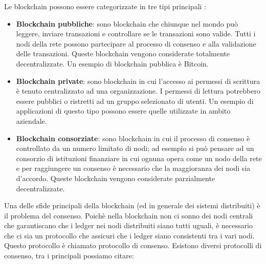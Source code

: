 \documentclass[../../Thesis.tex]{subfiles}
\begin{document}
Le blockchain possono essere categorizzate in tre tipi principali \cite{Tassonomia}:
\begin{itemize}
    \item \textbf{Blockchain pubbliche}: sono blockchain che chiunque nel mondo può leggere, inviare transazioni e controllare se le transazioni sono valide. Tutti i nodi della rete possono partecipare al processo di consenso e alla validazione delle transazioni. Queste blockchain vengono considerate totalmente decentralizzate. Un esempio di blockchain pubblica è Bitcoin.
    \item \textbf{Blockchain private}: sono blockchain in cui l'accesso ai permessi di scrittura è tenuto centralizzato ad una organizzazione. I permessi di lettura potrebbero essere pubblici o ristretti ad un gruppo selezionato di utenti. Un esempio di applicazioni di questo tipo possono essere quelle utilizzate in ambito aziendale.
    \item \textbf{Blockchain consorziate}: sono blockchain in cui il processo di consenso è controllato da un numero limitato di nodi; ad esempio si può pensare ad un consorzio di istituzioni finanziare in cui ognuna opera come un nodo della rete e per raggiungere un consenso è necessario che la maggioranza dei nodi sia d'accordo. Queste blockchain vengono considerate parzialmente decentralizzate.
\end{itemize}
Una delle sfide principali della blockchain (ed in generale dei sistemi distribuiti) è il problema del consenso. Poichè nella blockchain non ci sonno dei nodi centrali che garantiscano che i ledger nei nodi distribuiti siano tutti uguali, è necessario che ci sia un protocollo che assicuri che i ledger siano consistenti tra i vari nodi. Questo protocollo è chiamato protocollo di consenso. Esistono diversi protocolli di consenso, tra i principali possiamo citare:
\end{document}
